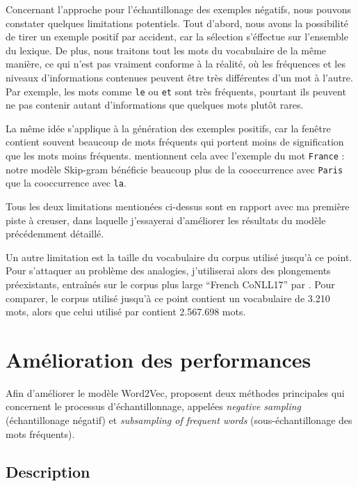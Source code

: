 \documentclass[12pt]{article}
\begin{document}
Concernant l'approche pour l'échantillonage des exemples négatifs, nous pouvons constater quelques limitations potentiels. Tout d'abord, nous avons la possibilité de tirer un exemple positif par accident, car la sélection s'éffectue sur l'ensemble du lexique. De plus, nous traitons tout les mots du vocabulaire de la même manière, ce qui n'est pas vraiment conforme à la réalité, où les fréquences et les niveaux d'informations contenues peuvent être très différentes d'un mot à l'autre. Par exemple, les mots comme \texttt{le} ou \texttt{et} sont très fréquents, pourtant ils peuvent ne pas contenir autant d'informations que quelques mots plutôt rares. 

La même idée s'applique à la génération des exemples positifs, car la fenêtre contient souvent beaucoup de mots fréquents qui portent moins de signification que les mots moins fréquents. \cite{DBLP:conf/nips/MikolovSCCD13} mentionnent cela avec l'exemple du mot \texttt{France} : notre modèle Skip-gram bénéficie beaucoup plus de la cooccurrence avec \texttt{Paris} que la cooccurrence avec \texttt{la}. 

Tous les deux limitations mentionées ci-dessus sont en rapport avec ma première piste à creuser, dans laquelle j'essayerai d'améliorer les résultats du modèle précédemment détaillé.  

Un autre limitation est la taille du vocabulaire du corpus utilisé jusqu'à ce point. Pour s'attaquer au problème des analogies, j'utiliserai alors des plongements préexistants, entraînés sur le corpus plus large ``French CoNLL17'' par \cite{fares-etal-2017-word}. Pour comparer, le corpus utilisé jusqu'à ce point contient un vocabulaire de 3.210 mots, alors que celui utilisé par \cite{fares-etal-2017-word} contient 2.567.698 mots.

\section{Amélioration des performances} \label{amélioration des performances}

Afin d'améliorer le modèle Word2Vec, \cite{DBLP:conf/nips/MikolovSCCD13} proposent deux méthodes principales qui concernent le processus d'échantillonnage, appelées \textit{negative sampling} (échantillonage négatif) et \textit{subsampling of frequent words} (sous-échantillonage des mots fréquents). 

\subsection{Description} \label{description-1}
\end{document}
